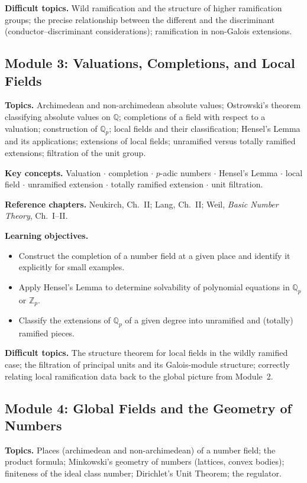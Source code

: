 \documentclass[11pt]{article}
\newcommand{\Q}{\mathbb{Q}}
\newcommand{\Z}{\mathbb{Z}}
\begin{document}
\textbf{Difficult topics.} Wild ramification and the structure of higher ramification groups; the precise relationship between the different and the discriminant (conductor--discriminant considerations); ramification in non-Galois extensions.

\subsection*{Module 3: Valuations, Completions, and Local Fields}
\textbf{Topics.} Archimedean and non-archimedean absolute values; Ostrowski's theorem classifying absolute values on $\Q$; completions of a field with respect to a valuation; construction of $\Q_p$; local fields and their classification; Hensel's Lemma and its applications; extensions of local fields; unramified versus totally ramified extensions; filtration of the unit group.

\textbf{Key concepts.} Valuation $\cdot$ completion $\cdot$ $p$-adic numbers $\cdot$ Hensel's Lemma $\cdot$ local field $\cdot$ unramified extension $\cdot$ totally ramified extension $\cdot$ unit filtration.

\textbf{Reference chapters.} Neukirch, Ch.~II; Lang, Ch.~II; Weil, \emph{Basic Number Theory}, Ch.~I--II.

\textbf{Learning objectives.}
\begin{itemize}[leftmargin=*]
  \item Construct the completion of a number field at a given place and identify it explicitly for small examples.
  \item Apply Hensel's Lemma to determine solvability of polynomial equations in $\Q_p$ or $\Z_p$.
  \item Classify the extensions of $\Q_p$ of a given degree into unramified and (totally) ramified pieces.
\end{itemize}

\textbf{Difficult topics.} The structure theorem for local fields in the wildly ramified case; the filtration of principal units and its Galois-module structure; correctly relating local ramification data back to the global picture from Module~2.

\subsection*{Module 4: Global Fields and the Geometry of Numbers}
\textbf{Topics.} Places (archimedean and non-archimedean) of a number field; the product formula; Minkowski's geometry of numbers (lattices, convex bodies); finiteness of the ideal class number; Dirichlet's Unit Theorem; the regulator.
\end{document}
